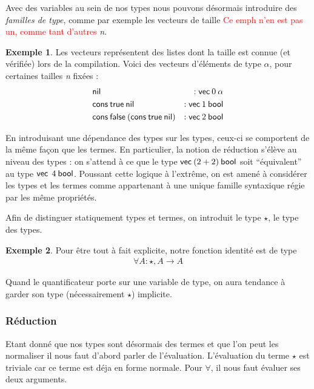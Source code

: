 \documentclass {article}
\theoremstyle{definition}
\newtheorem{example}{Exemple}
\theoremstyle{remark}
\newcommand{\todo}[1]{\textcolor{red}{#1}}
\begin{document}
Avec des variables au sein de nos types nous pouvons désormais introduire des \emph{familles de type},
comme par exemple les vecteurs de taille \todo{Ce emph n'en est pas un, comme tant d'autres} \emph{n}.
\begin{example}  
  \label{example vecteur}
  Les vecteurs représentent des listes dont la taille est connue (et
  vérifiée) lors de la compilation. Voici des vecteurs d'éléments de
  type $\alpha$, pour certaines tailles \emph{n} fixées : 
  \begin{align*}
    &\mathsf{nil} &: \mathsf{vec}\: 0\: \alpha \\
    &\mathsf{cons}\: \mathsf{true}\: \mathsf{nil} &: \mathsf{vec}\: 1\: \mathsf{bool} \\
    &\mathsf{cons}\: \mathsf{false}\: (\mathsf{cons}\: \mathsf{true}\: \mathsf{nil}) &: \mathsf{vec}\: 2\: \mathsf{bool} \\
  \end{align*}
\end{example}
En introduisant une dépendance des types sur les types, ceux-ci se
comportent de la même façon que les termes. En particulier, la notion
de réduction s'élève au niveau des types : on s'attend à ce que le
type \(\mathsf{vec}\: (2 + 2)\: \mathsf{bool}\) soit ``équivalent'' au type \(\mathsf{vec}\:\:
4\: \mathsf{bool}\).  Poussant cette logique à l'extrême, on est amené à
considérer les types et les termes comme appartenant à une unique
famille syntaxique régie par les même propriétés.

Afin de distinguer statiquement types et termes, on introduit le type
$\star$, le type des types.
\begin{example}
  Pour être tout à fait explicite, notre fonction identité est de type
  \begin{align*}
    \forall A : \star, A \rightarrow A
  \end{align*}
  
  Quand le quantificateur porte sur une variable de type, on aura
  tendance à garder son type (nécessairement $\star$) implicite.

\end{example}

\subsubsection{Réduction}
\label{maj_eval}

Etant donné que nos types sont désormais des termes et que l'on peut
les normaliser il nous faut d'abord parler de l'évaluation. 
L'évaluation du terme $\star$ est triviale car ce terme est déja en forme normale.
Pour $\forall$, il nous faut évaluer ses deux arguments.
\end{document}
